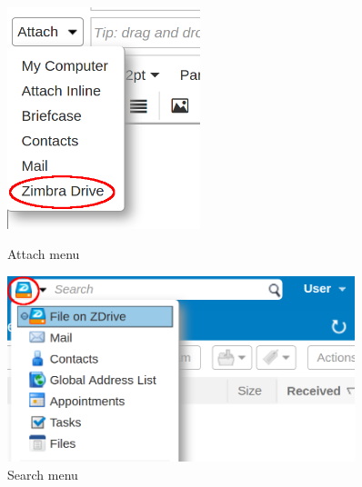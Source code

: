 \begin{figure}[htbp,!h]
    \centering
    \begin{minipage}{0.45\textwidth}
        \centering
        \includegraphics[width=0.5\textwidth]{src/images/ZD-attachMenu.png} %
        \caption{Attach menu}
        \label{==fig:attachMenu==}
    \end{minipage}
    \hfill
    \begin{minipage}{0.45\textwidth}
        \centering
        \includegraphics[width=0.9\textwidth]{src/images/ZD-searchMenu.png} %
        \caption{Search menu}
        \label{==fig:searchMenu==}
    \end{minipage}
\end{figure}





